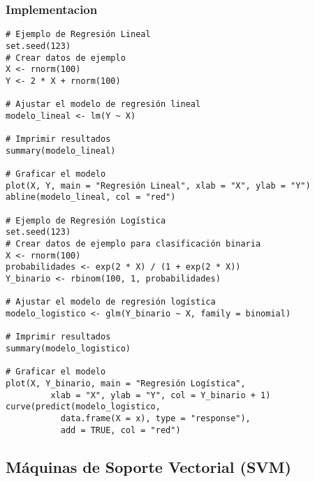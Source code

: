 \documentclass{book}
\begin{document}
\subsubsection{Implementacion}
\begin{verbatim}
# Ejemplo de Regresión Lineal
set.seed(123)
# Crear datos de ejemplo
X <- rnorm(100)
Y <- 2 * X + rnorm(100)

# Ajustar el modelo de regresión lineal
modelo_lineal <- lm(Y ~ X)

# Imprimir resultados
summary(modelo_lineal)

# Graficar el modelo
plot(X, Y, main = "Regresión Lineal", xlab = "X", ylab = "Y")
abline(modelo_lineal, col = "red")

# Ejemplo de Regresión Logística
set.seed(123)
# Crear datos de ejemplo para clasificación binaria
X <- rnorm(100)
probabilidades <- exp(2 * X) / (1 + exp(2 * X))
Y_binario <- rbinom(100, 1, probabilidades)

# Ajustar el modelo de regresión logística
modelo_logistico <- glm(Y_binario ~ X, family = binomial)

# Imprimir resultados
summary(modelo_logistico)

# Graficar el modelo
plot(X, Y_binario, main = "Regresión Logística", 
         xlab = "X", ylab = "Y", col = Y_binario + 1)
curve(predict(modelo_logistico, 
           data.frame(X = x), type = "response"), 
           add = TRUE, col = "red")
\end{verbatim}


\subsection{Máquinas de Soporte Vectorial (SVM)}
\end{document}
